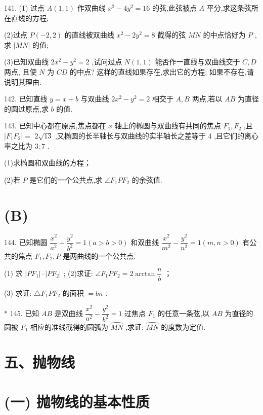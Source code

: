 141. (1) 过点 $A\left( {1,1}\right)$ 作双曲线 ${x}^{2} - 4{y}^{2} = {16}$ 的弦,此弦被点 $A$ 平分,求这条弦所在直线的方程;

(2)过点 $P\left( {-2,2}\right)$ 的直线被双曲线 ${x}^{2} - 2{y}^{2} = 8$ 截得的弦 ${MN}$ 的中点恰好为 $P$ ,求 $\left| {MN}\right|$ 的值;

(3)已知双曲线 $2{x}^{2} - {y}^{2} = 2$ ,试问过点 $N\left( {1,1}\right)$ 能否作一直线与双曲线交于 $C,D$ 两点, 且使 $N$ 为 ${CD}$ 的中点? 这样的直线如果存在,求出它的方程; 如果不存在,请说明其理由.

142. 已知直线 $y = x + b$ 与双曲线 $2{x}^{2} - {y}^{2} = 2$ 相交于 $A,B$ 两点,若以 ${AB}$ 为直径的圆过原点,求 $b$ 的值.

143. 已知中心都在原点,焦点都在 $x$ 轴上的椭圆与双曲线有共同的焦点 ${F}_{1},{F}_{2}$ ,且 $\left| {{F}_{1}{F}_{2}}\right|  =$  $2\sqrt{13}$ ,又椭圆的长半轴长与双曲线的实半轴长之差等于 4 ,且它们的离心率之比为 $3 : 7$ .

(1)求椭圆和双曲线的方程；

(2)若 $P$ 是它们的一个公共点,求 $\angle {F}_{1}P{F}_{2}$ 的余弦值.

\section*{(B)}

144. 已知椭圆 $\dfrac{{x}^{2}}{{a}^{2}} + \dfrac{{y}^{2}}{{b}^{2}} = 1\left( {a > b > 0}\right)$ 和双曲线 $\dfrac{{x}^{2}}{{m}^{2}} - \dfrac{{y}^{2}}{{n}^{2}} = 1\left( {m,n > 0}\right)$ 有公共的焦点 ${F}_{1},{F}_{2},P$ 是两曲线的一个公共点.

(1) 求 $\left| {P{F}_{1}}\right|  \cdot  \left| {P{F}_{2}}\right|$ ; (2)求证: $\angle {F}_{1}P{F}_{2} = 2\arctan \dfrac{n}{b}$ ；

(3) 求证: $\bigtriangleup {F}_{1}P{F}_{2}$ 的面积 $= {bn}$ .

* 145. 已知 ${AB}$ 是双曲线 $\dfrac{{x}^{2}}{{a}^{2}} - \dfrac{{y}^{2}}{{b}^{2}} = 1$ 过焦点 ${F}_{1}$ 的任意一条弦,以 ${AB}$ 为直径的圆被 ${F}_{1}$ 相应的准线截得的圆弧为 $\overset{⏜}{MN}$ ,求证: $\overset{⏜}{MN}$ 的度数为定值.

\section*{五、抛物线}

\section*{(一) 抛物线的基本性质}

